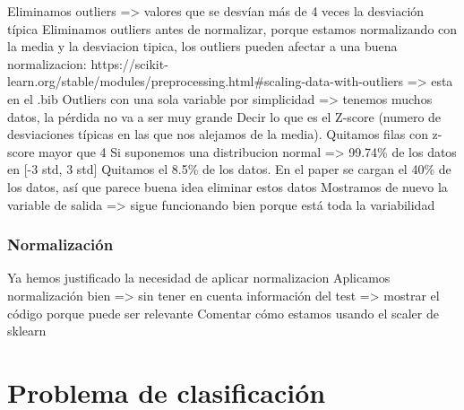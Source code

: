 \documentclass[11pt]{article}
\begin{document}
Eliminamos outliers => valores que se desvían más de 4 veces la desviación típica
Eliminamos outliers antes de normalizar, porque estamos normalizando con la media y la desviacion tipica, los outliers pueden afectar a una buena normalizacion: https://scikit-learn.org/stable/modules/preprocessing.html#scaling-data-with-outliers => esta en el .bib
Outliers con una sola variable por simplicidad => tenemos muchos datos, la pérdida no va a ser muy grande
Decir lo que es el Z-score (numero de desviaciones típicas en las que nos alejamos de la media). Quitamos filas con z-score mayor que 4
Si suponemos una distribucion normal => 99.74\% de los datos en [-3 std, 3 std]
Quitamos el 8.5\% de los datos. En el paper se cargan el 40\% de los datos, así que parece buena idea eliminar estos datos
Mostramos de nuevo la variable de salida => sigue funcionando bien porque está toda la variabilidad

\subsubsection{Normalización}

Ya hemos justificado la necesidad de aplicar normalizacion
Aplicamos normalización bien => sin tener en cuenta información del test => mostrar el código porque puede ser relevante
Comentar cómo estamos usando el scaler de sklearn



\pagebreak
\section{Problema de clasificación}
\end{document}
